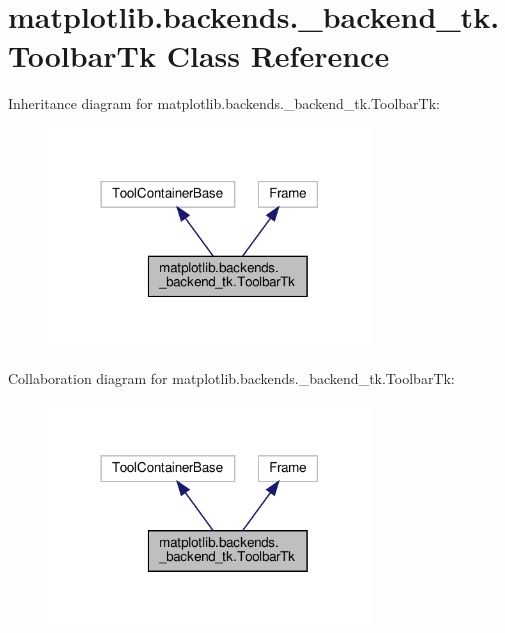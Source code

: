 \hypertarget{classmatplotlib_1_1backends_1_1__backend__tk_1_1ToolbarTk}{}\section{matplotlib.\+backends.\+\_\+backend\+\_\+tk.\+Toolbar\+Tk Class Reference}
\label{classmatplotlib_1_1backends_1_1__backend__tk_1_1ToolbarTk}


Inheritance diagram for matplotlib.\+backends.\+\_\+backend\+\_\+tk.\+Toolbar\+Tk\+:
\nopagebreak
\begin{figure}[H]
\begin{center}
\leavevmode
\includegraphics[width=242pt]{classmatplotlib_1_1backends_1_1__backend__tk_1_1ToolbarTk__inherit__graph}
\end{center}
\end{figure}


Collaboration diagram for matplotlib.\+backends.\+\_\+backend\+\_\+tk.\+Toolbar\+Tk\+:
\nopagebreak
\begin{figure}[H]
\begin{center}
\leavevmode
\includegraphics[width=242pt]{classmatplotlib_1_1backends_1_1__backend__tk_1_1ToolbarTk__coll__graph}
\end{center}
\end{figure}

